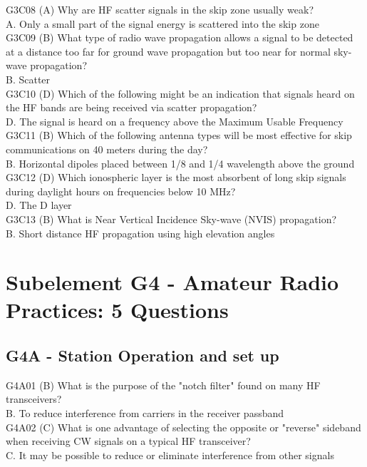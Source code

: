 \documentclass[12pt,letterpaper]{report}
\begin{document}
G3C08 (A) Why are HF scatter signals in the skip zone usually weak?\\
A. Only a small part of the signal energy is scattered into the skip zone\\

G3C09 (B) What type of radio wave propagation allows a signal to be detected at a distance too far for ground wave propagation but too near for normal sky-wave propagation?\\
B. Scatter\\

G3C10 (D)
Which of the following might be an indication that signals heard on the HF bands are being received via scatter propagation?\\
D. The signal is heard on a frequency above the Maximum Usable Frequency\\

G3C11 (B) Which of the following antenna types will be most effective for skip communications on 40 meters during the day?\\
B. Horizontal dipoles placed between 1/8 and 1/4 wavelength above the ground\\

G3C12 (D) Which ionospheric layer is the most absorbent of long skip signals during daylight hours on frequencies below 10 MHz?\\
D. The D layer\\

G3C13 (B) What is Near Vertical Incidence Sky-wave (NVIS) propagation?\\
B. Short distance HF propagation using high elevation angles\\

\chapter{Subelement G4 - Amateur Radio Practices: 5 Questions}
\section{G4A - Station Operation and set up}

G4A01 (B) What is the purpose of the "notch filter" found on many HF transceivers?\\
B. To reduce interference from carriers in the receiver passband\\

G4A02 (C) What is one advantage of selecting the opposite or "reverse" sideband when receiving CW signals on a typical HF transceiver?\\
C. It may be possible to reduce or eliminate interference from other signals\\
\end{document}
